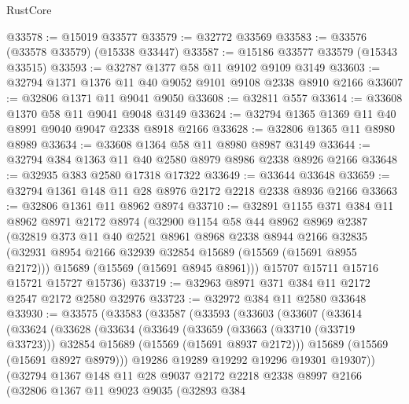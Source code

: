 \begin{lexlean}{RustCore}
\begin{coremodule}
@33578 := @15019 @33577
@33579 := @32772 @33569
@33583 := @33576 (@33578 @33579) (@15338 @33447)
@33587 := @15186 @33577 @33579 (@15343 @33515)
@33593 := @32787 @1377 @58 @11 @9102 @9109 @3149
@33603 := @32794 @1371 @1376 @11 @40 @9052 @9101 @9108 @2338 @8910 @2166
@33607 := @32806 @1371 @11 @9041 @9050
@33608 := @32811 @557
@33614 := @33608 @1370 @58 @11 @9041 @9048 @3149
@33624 := @32794 @1365 @1369 @11 @40 @8991 @9040 @9047 @2338 @8918 @2166
@33628 := @32806 @1365 @11 @8980 @8989
@33634 := @33608 @1364 @58 @11 @8980 @8987 @3149
@33644 := @32794 @384 @1363 @11 @40 @2580 @8979 @8986 @2338 @8926 @2166
@33648 := @32935 @383 @2580 @17318 @17322
@33649 := @33644 @33648
@33659 := @32794 @1361 @148 @11 @28 @8976 @2172 @2218 @2338 @8936 @2166
@33663 := @32806 @1361 @11 @8962 @8974
@33710 := @32891
    @1155
    @371
    @384
    @11
    @8962
    @8971
    @2172
    @8974
    (@32900
      @1154
      @58
      @44
      @8962
      @8969
      @2387
      (@32819
        @373
        @11
        @40
        @2521
        @8961
        @8968
        @2338
        @8944
        @2166
        @32835
        (@32931 @8954 @2166 @32939 @32854 @15689 (@15569 (@15691 @8955 @2172)))
        @15689
        (@15569 (@15691 @8945 @8961)))
      @15707
      @15711
      @15716
      @15721
      @15727
      @15736)
@33719 := @32963 @8971 @371 @384 @11 @2172 @2547 @2172 @2580 @32976
@33723 := @32972 @384 @11 @2580 @33648
@33930 := @33575
    (@33583
      (@33587
        (@33593
          (@33603
            (@33607
              (@33614
                (@33624
                  (@33628
                    (@33634
                      (@33649
                        (@33659
                          (@33663 (@33710 (@33719 @33723)))
                          @32854
                          @15689
                          (@15569 (@15691 @8937 @2172)))
                        @15689
                        (@15569 (@15691 @8927 @8979)))
                      @19286
                      @19289
                      @19292
                      @19296
                      @19301
                      @19307))
                  (@32794
                    @1367
                    @148
                    @11
                    @28
                    @9037
                    @2172
                    @2218
                    @2338
                    @8997
                    @2166
                    (@32806
                      @1367
                      @11
                      @9023
                      @9035
                      (@32893
                        @384

\end{coremodule}
\end{lexlean}
